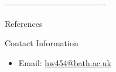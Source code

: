 \documentclass[final]{beamer}
\theoremstyle{plain}
\theoremstyle{definition}
\theoremstyle{remark}
\newlength{\threecolwid}
\begin{document}
\begin{frame}[t]
\begin{columns}[t]
\begin{column}{\threecolwid}

-------------------------------------







\begin{alertblock}{References}

\nocite{*} %
\tiny{\scalebox {.2}{} 
 \vspace{0.75in}}

\end{alertblock}


\begin{alertblock}{Contact Information} \small

\begin{itemize}
\item Email: \href{mailto:hw454@bath.ac.uk}{hw454@bath.ac.uk}

\end{itemize}

\end{alertblock}




\end{column}
\end{columns}
\end{frame}
\end{document}
